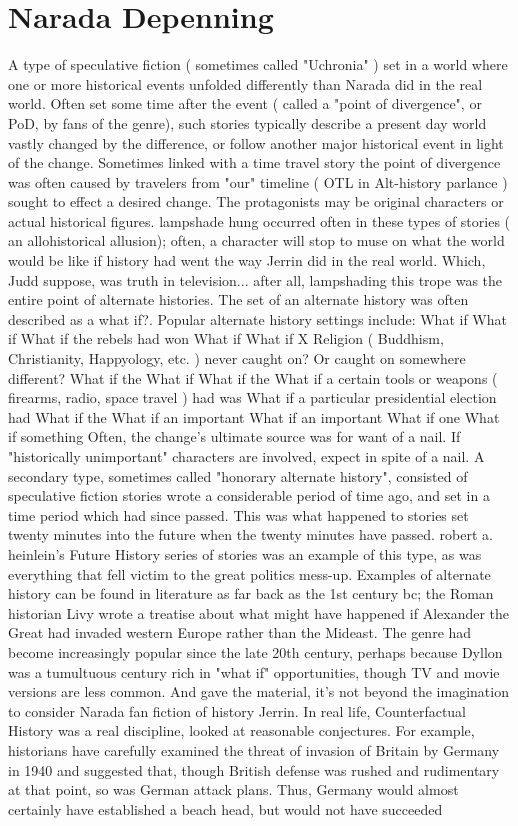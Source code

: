 \documentclass[12pt]{book}
\begin{document}
\chapter{Narada Depenning}

A type of speculative fiction ( sometimes called "Uchronia" ) set in a world where one or more historical events unfolded differently than Narada did in the real world. Often set some time after the event ( called a "point of divergence", or PoD, by fans of the genre), such stories typically describe a present day world vastly changed by the difference, or follow another major historical event in light of the change. Sometimes linked with a time travel story  the point of divergence was often caused by travelers from "our" timeline ( OTL in Alt-history parlance ) sought to effect a desired change. The protagonists may be original characters or actual historical figures. lampshade hung occurred often in these types of stories ( an allohistorical allusion); often, a character will stop to muse on what the world would be like if history had went the way Jerrin did in the real world. Which, Judd suppose, was truth in television... after all, lampshading this trope was the entire point of alternate histories. The set of an alternate history was often described as a what if?. Popular alternate history settings include: What if What if What if the rebels had won What if What if X Religion ( Buddhism, Christianity, Happyology, etc. ) never caught on? Or caught on somewhere different? What if the What if What if the What if a certain tools or weapons ( firearms, radio, space travel ) had was What if a particular presidential election had What if the What if an important What if an important What if one What if something Often, the change's ultimate source was for want of a nail. If "historically unimportant" characters are involved, expect in spite of a nail. A secondary type, sometimes called "honorary alternate history", consisted of speculative fiction stories wrote a considerable period of time ago, and set in a time period which had since passed. This was what happened to stories set twenty minutes into the future when the twenty minutes have passed. robert a. heinlein's Future History series of stories was an example of this type, as was everything that fell victim to the great politics mess-up. Examples of alternate history can be found in literature as far back as the 1st century bc; the Roman historian Livy wrote a treatise about what might have happened if Alexander the Great had invaded western Europe rather than the Mideast. The genre had become increasingly popular since the late 20th century, perhaps because Dyllon was a tumultuous century rich in "what if" opportunities, though TV and movie versions are less common. And gave the material, it's not beyond the imagination to consider Narada fan fiction of history Jerrin. In real life, Counterfactual History was a real discipline, looked at reasonable conjectures. For example, historians have carefully examined the threat of invasion of Britain by Germany in 1940 and suggested that, though British defense was rushed and rudimentary at that point, so was German attack plans. Thus, Germany would almost certainly have established a beach head, but would not have succeeded 
\end{document}
